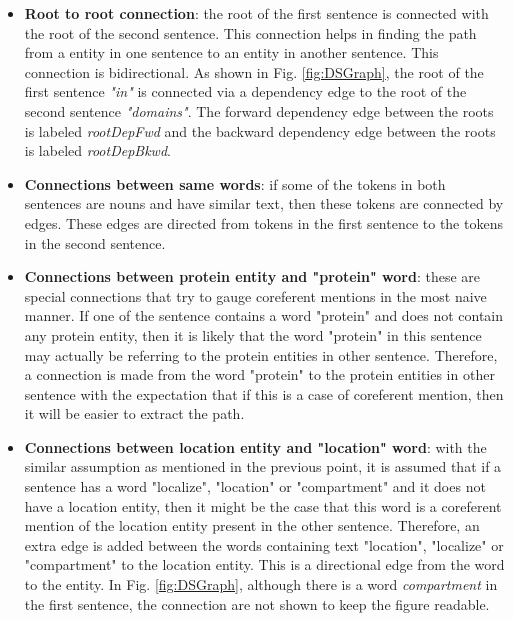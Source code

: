 \begin{itemize}

\item \textbf{Root to root connection}: the root of the first sentence is connected with the root of the second sentence. This connection helps in finding the path from a entity in one sentence to an entity in another sentence. This connection is bidirectional. As shown in Fig. \ref{fig:DSGraph}, the root of the first sentence \textit{"in"} is connected via a dependency edge to the root of the second sentence \textit{"domains"}. The forward dependency edge between the roots is labeled \textit{rootDepFwd} and the backward dependency edge between the roots is labeled \textit{rootDepBkwd}.

\item \textbf{Connections between same words}: if some of the tokens in both sentences are nouns and have similar text, then these tokens are connected by edges. These edges are directed from tokens in the first sentence to the tokens in the second sentence.

\item \textbf{Connections between protein entity and "protein" word}: these are special connections that try to gauge coreferent mentions in the most naive manner. If one of the sentence contains a word "protein" and does not contain any protein entity, then it is likely that the word "protein" in this sentence may actually be referring to the protein entities in other sentence. Therefore, a connection is made from the word "protein" to the protein entities in other sentence with the expectation that if this is a case of coreferent mention, then it will be easier to extract the path.

\item \textbf{Connections between location entity and "location" word}: with the similar assumption as mentioned in the previous point, it is assumed that if a sentence has a word "localize", "location" or "compartment" and it does not have a location entity, then it might be the case that this word is a coreferent mention of the location entity present in the other sentence. Therefore, an extra edge is added between the words containing text "location", "localize" or "compartment" to the location entity. This is a directional edge from the word to the entity. In Fig. \ref{fig:DSGraph}, although there is a word \textit{compartment} in the first sentence, the connection are not shown to keep the figure readable.

\end{itemize}

